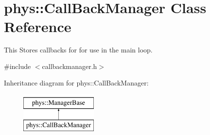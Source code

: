 \hypertarget{classphys_1_1CallBackManager}{
\section{phys::CallBackManager Class Reference}
\label{d1/d47/classphys_1_1CallBackManager}
}


This Stores callbacks for for use in the main loop.  




{\ttfamily \#include $<$callbackmanager.h$>$}

Inheritance diagram for phys::CallBackManager:\begin{figure}[H]
\begin{center}
\leavevmode
\includegraphics[height=2cm]{d1/d47/classphys_1_1CallBackManager}
\end{center}
\end{figure}
